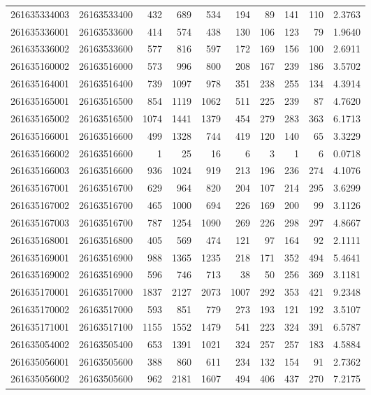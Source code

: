 \documentclass[
  11pt,
]{article}
\begin{document}
\begin{longtable}[t]{llrrrrrrrr}
261635334003 & 26163533400 & 432 & 689 & 534 & 194 & 89 & 141 & 110 & 2.3763\\
261635336001 & 26163533600 & 414 & 574 & 438 & 130 & 106 & 123 & 79 & 1.9640\\
261635336002 & 26163533600 & 577 & 816 & 597 & 172 & 169 & 156 & 100 & 2.6911\\
261635160002 & 26163516000 & 573 & 996 & 800 & 208 & 167 & 239 & 186 & 3.5702\\
261635164001 & 26163516400 & 739 & 1097 & 978 & 351 & 238 & 255 & 134 & 4.3914\\
261635165001 & 26163516500 & 854 & 1119 & 1062 & 511 & 225 & 239 & 87 & 4.7620\\
261635165002 & 26163516500 & 1074 & 1441 & 1379 & 454 & 279 & 283 & 363 & 6.1713\\
261635166001 & 26163516600 & 499 & 1328 & 744 & 419 & 120 & 140 & 65 & 3.3229\\
261635166002 & 26163516600 & 1 & 25 & 16 & 6 & 3 & 1 & 6 & 0.0718\\
261635166003 & 26163516600 & 936 & 1024 & 919 & 213 & 196 & 236 & 274 & 4.1076\\
261635167001 & 26163516700 & 629 & 964 & 820 & 204 & 107 & 214 & 295 & 3.6299\\
261635167002 & 26163516700 & 465 & 1000 & 694 & 226 & 169 & 200 & 99 & 3.1126\\
261635167003 & 26163516700 & 787 & 1254 & 1090 & 269 & 226 & 298 & 297 & 4.8667\\
261635168001 & 26163516800 & 405 & 569 & 474 & 121 & 97 & 164 & 92 & 2.1111\\
261635169001 & 26163516900 & 988 & 1365 & 1235 & 218 & 171 & 352 & 494 & 5.4641\\
261635169002 & 26163516900 & 596 & 746 & 713 & 38 & 50 & 256 & 369 & 3.1181\\
261635170001 & 26163517000 & 1837 & 2127 & 2073 & 1007 & 292 & 353 & 421 & 9.2348\\
261635170002 & 26163517000 & 593 & 851 & 779 & 273 & 193 & 121 & 192 & 3.5107\\
261635171001 & 26163517100 & 1155 & 1552 & 1479 & 541 & 223 & 324 & 391 & 6.5787\\
261635054002 & 26163505400 & 653 & 1391 & 1021 & 324 & 257 & 257 & 183 & 4.5884\\
261635056001 & 26163505600 & 388 & 860 & 611 & 234 & 132 & 154 & 91 & 2.7362\\
261635056002 & 26163505600 & 962 & 2181 & 1607 & 494 & 406 & 437 & 270 & 7.2175\\

\end{longtable}
\end{document}
